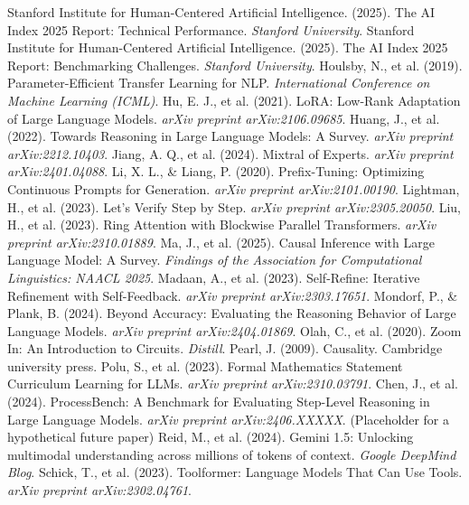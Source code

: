 \documentclass{article}
\begin{document}
\begin{thebibliography}{99}
Stanford Institute for Human-Centered Artificial Intelligence. (2025). The AI Index 2025 Report: Technical Performance. \textit{Stanford University}.
Stanford Institute for Human-Centered Artificial Intelligence. (2025). The AI Index 2025 Report: Benchmarking Challenges. \textit{Stanford University}.
Houlsby, N., et al. (2019). Parameter-Efficient Transfer Learning for NLP. \textit{International Conference on Machine Learning (ICML)}.
Hu, E. J., et al. (2021). LoRA: Low-Rank Adaptation of Large Language Models. \textit{arXiv preprint arXiv:2106.09685}.
Huang, J., et al. (2022). Towards Reasoning in Large Language Models: A Survey. \textit{arXiv preprint arXiv:2212.10403}.
Jiang, A. Q., et al. (2024). Mixtral of Experts. \textit{arXiv preprint arXiv:2401.04088}.
Li, X. L., \& Liang, P. (2020). Prefix-Tuning: Optimizing Continuous Prompts for Generation. \textit{arXiv preprint arXiv:2101.00190}.
Lightman, H., et al. (2023). Let's Verify Step by Step. \textit{arXiv preprint arXiv:2305.20050}.
Liu, H., et al. (2023). Ring Attention with Blockwise Parallel Transformers. \textit{arXiv preprint arXiv:2310.01889}.
Ma, J., et al. (2025). Causal Inference with Large Language Model: A Survey. \textit{Findings of the Association for Computational Linguistics: NAACL 2025}.
Madaan, A., et al. (2023). Self-Refine: Iterative Refinement with Self-Feedback. \textit{arXiv preprint arXiv:2303.17651}.
Mondorf, P., \& Plank, B. (2024). Beyond Accuracy: Evaluating the Reasoning Behavior of Large Language Models. \textit{arXiv preprint arXiv:2404.01869}.
Olah, C., et al. (2020). Zoom In: An Introduction to Circuits. \textit{Distill}.
Pearl, J. (2009). Causality. Cambridge university press.
Polu, S., et al. (2023). Formal Mathematics Statement Curriculum Learning for LLMs. \textit{arXiv preprint arXiv:2310.03791}.
Chen, J., et al. (2024). ProcessBench: A Benchmark for Evaluating Step-Level Reasoning in Large Language Models. \textit{arXiv preprint arXiv:2406.XXXXX}. (Placeholder for a hypothetical future paper)
Reid, M., et al. (2024). Gemini 1.5: Unlocking multimodal understanding across millions of tokens of context. \textit{Google DeepMind Blog}.
Schick, T., et al. (2023). Toolformer: Language Models That Can Use Tools. \textit{arXiv preprint arXiv:2302.04761}.

\end{thebibliography}
\end{document}
